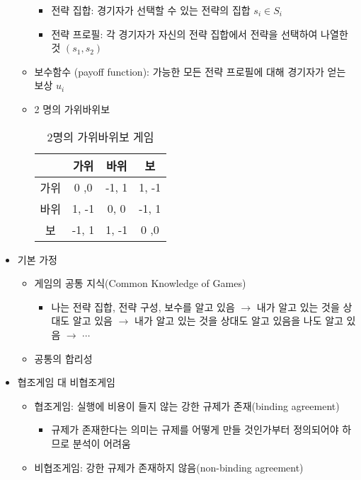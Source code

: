 \begin{itemize}
\begin{itemize}
		\begin{itemize}
		\item 전략 집합: 경기자가 선택할 수 있는 전략의 집합 $s_{i} \in S_{i}$
		\item 전략 프로필: 각 경기자가 자신의 전략 집합에서 전략을 선택하여 나열한 것 $(s_{1}, s_{2})$
		\end{itemize}
	\item 보수함수 (payoff function): 가능한 모든 전략 프로필에 대해 경기자가 얻는 보상 $u_{i}$
	\item 2 명의 가위바위보
				\begin{table}[htp]
				\caption{2명의 가위바위보 게임}
				\begin{center}
				\begin{tabular}{cccc}
				\toprule
				 & 가위 & 바위 & 보\\
				\midrule
				 가위 & 0 ,0 & -1, 1 & 1, -1 \\
				 바위 & 1, -1 & 0, 0 & -1, 1 \\
				 보 & -1, 1 & 1, -1 & 0 ,0 \\
				\bottomrule
				\end{tabular}
				\end{center}
				\label{tab:twopersonsrockpaperscissorsgame}
				\end{table}%
	\end{itemize}
\item 기본 가정
	\begin{itemize}
	\item 게임의 공통 지식(Common Knowledge of Games)
		\begin{itemize}
		\item 나는 전략 집합, 전략 구성, 보수를 알고 있음 $\rightarrow$ 내가 알고 있는 것을 상대도 알고 있음 $\rightarrow$ 내가 알고 있는 것을 상대도 알고 있음을 나도 알고 있음 $\rightarrow$ $\cdots$
		\end{itemize}
	\item 공통의 합리성
	\end{itemize}
\item 협조게임 대 비협조게임
	\begin{itemize}
	\item 협조게임: 실행에 비용이 들지 않는 강한 규제가 존재(binding agreement)
		\begin{itemize}
		\item 규제가 존재한다는 의미는 규제를 어떻게 만들 것인가부터 정의되어야 하므로 분석이 어려움
		\end{itemize}
	\item 비협조게임: 강한 규제가 존재하지 않음(non-binding agreement)

\end{itemize}
\end{itemize}
